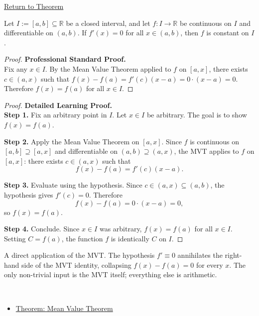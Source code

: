 \newpage
{}
\label{prf:zero-derivative-implies-constant}

\begin{remark*}[Return]
\hyperref[thm:zero-derivative-implies-constant]{Return to Theorem}
\end{remark*}

\begin{theorem*}
Let $I := [a,b] \subseteq \mathbb{R}$ be a closed interval, and let $f : I \to \mathbb{R}$ be continuous on $I$ and differentiable on $(a,b)$. If $f'(x) = 0$ for all $x \in (a,b)$, then $f$ is constant on $I$.
\end{theorem*}

\begin{proof}
\textbf{Professional Standard Proof.}~\\
Fix any $x \in I$. By the Mean Value Theorem applied to $f$ on $[a,x]$, there exists $c \in (a,x)$ such that $f(x) - f(a) = f'(c)(x-a) = 0 \cdot (x-a) = 0$. Therefore $f(x) = f(a)$ for all $x \in I$.
\end{proof}

\begin{proof}
\textbf{Detailed Learning Proof.}~\\

\textbf{Step 1.} Fix an arbitrary point in $I$. Let $x \in I$ be arbitrary. The goal is to show $f(x) = f(a)$.

\textbf{Step 2.} Apply the Mean Value Theorem on $[a,x]$. Since $f$ is continuous on $[a,b] \supseteq [a,x]$ and differentiable on $(a,b) \supseteq (a,x)$, the MVT applies to $f$ on $[a,x]$: there exists $c \in (a,x)$ such that
\[
f(x) - f(a) = f'(c)(x-a).
\]

\textbf{Step 3.} Evaluate using the hypothesis. Since $c \in (a,x) \subseteq (a,b)$, the hypothesis gives $f'(c) = 0$. Therefore
\[
f(x) - f(a) = 0 \cdot (x - a) = 0,
\]
so $f(x) = f(a)$.

\textbf{Step 4.} Conclude. Since $x \in I$ was arbitrary, $f(x) = f(a)$ for all $x \in I$. Setting $C = f(a)$, the function $f$ is identically $C$ on $I$.
\end{proof}

\begin{remark*}
A direct application of the MVT. The hypothesis $f' \equiv 0$ annihilates the right-hand side of the MVT identity, collapsing $f(x) - f(a) = 0$ for every $x$. The only non-trivial input is the MVT itself; everything else is arithmetic.
\end{remark*}

\begin{remark*}[Dependencies]~\\
\begin{itemize}
  \item \hyperref[thm:mean-value-theorem]{Theorem: Mean Value Theorem}
\end{itemize}
\end{remark*}
